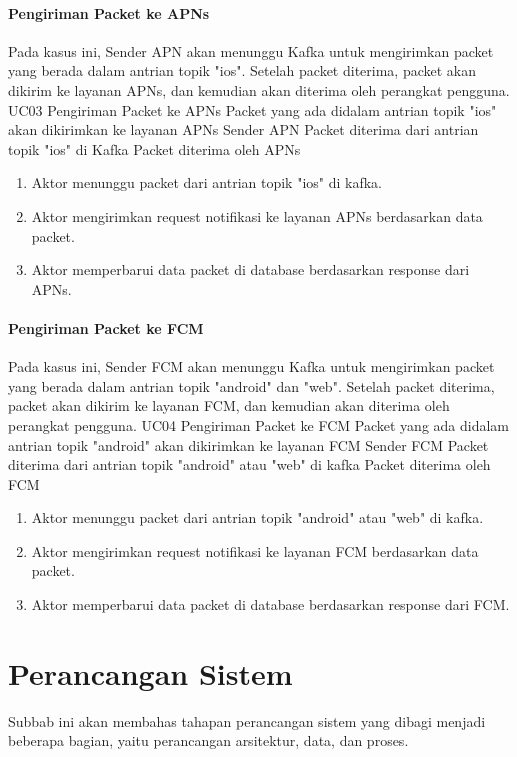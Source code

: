 \paragraph{Pengiriman Packet ke APNs}
\par Pada kasus ini, Sender APN akan menunggu Kafka untuk mengirimkan packet yang berada dalam antrian topik "ios".
Setelah packet diterima, packet akan dikirim ke layanan APNs, dan kemudian akan diterima oleh perangkat pengguna.
\tableUcDesc
{UC03}
{Pengiriman Packet ke APNs}
{Packet yang ada didalam antrian topik "ios" akan dikirimkan ke layanan APNs}
{Sender APN}
{Packet diterima dari antrian topik "ios" di Kafka}
{Packet diterima oleh APNs}
{
\begin{enumerate}
    \item Aktor menunggu packet dari antrian topik "ios" di kafka.
    \item Aktor mengirimkan request notifikasi ke layanan APNs berdasarkan data packet.
    \item Aktor memperbarui data packet di database berdasarkan response dari APNs.
\end{enumerate}
}

\paragraph{Pengiriman Packet ke FCM}
\par Pada kasus ini, Sender FCM akan menunggu Kafka untuk mengirimkan packet yang berada dalam antrian topik "android" dan "web".
Setelah packet diterima, packet akan dikirim ke layanan FCM, dan kemudian akan diterima oleh perangkat pengguna.
\tableUcDesc
{UC04}
{Pengiriman Packet ke FCM}
{Packet yang ada didalam antrian topik "android" akan dikirimkan ke layanan FCM}
{Sender FCM}
{Packet diterima dari antrian topik "android" atau "web" di kafka}
{Packet diterima oleh FCM}
{
\begin{enumerate}
    \item Aktor menunggu packet dari antrian topik "android" atau "web" di kafka.
    \item Aktor mengirimkan request notifikasi ke layanan FCM berdasarkan data packet.
    \item Aktor memperbarui data packet di database berdasarkan response dari FCM.
\end{enumerate}
}

\section{Perancangan Sistem}
\par Subbab ini akan membahas tahapan perancangan sistem yang dibagi menjadi beberapa bagian, yaitu perancangan
arsitektur, data, dan proses.

